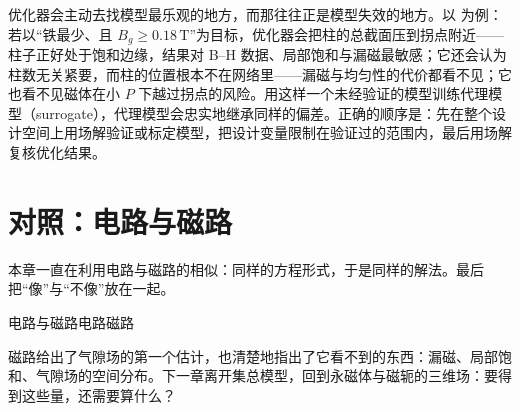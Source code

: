 \begin{pitfall}
优化器会主动去找模型最乐观的地方，而那往往正是模型失效的地方。以 为例：若以“铁最少、且 $B_g\ge0.18\,\mathrm T$”为目标，优化器会把柱的总截面压到拐点附近——柱子正好处于饱和边缘，结果对 B--H 数据、局部饱和与漏磁最敏感；它还会认为柱数无关紧要，而柱的位置根本不在网络里——漏磁与均匀性的代价都看不见；它也看不见磁体在小 $P$ 下越过拐点的风险。用这样一个未经验证的模型训练代理模型（surrogate），代理模型会忠实地继承同样的偏差。正确的顺序是：先在整个设计空间上用场解验证或标定模型，把设计变量限制在验证过的范围内，最后用场解复核优化结果。
\end{pitfall}

\section{对照：电路与磁路}\label{sec:lumped-compare}

本章一直在利用电路与磁路的相似：同样的方程形式，于是同样的解法。最后把“像”与“不像”放在一起。

\begin{compare}{电路与磁路}{电路}{磁路}
\end{compare}

磁路给出了气隙场的第一个估计，也清楚地指出了它看不到的东西：漏磁、局部饱和、气隙场的空间分布。下一章离开集总模型，回到永磁体与磁轭的三维场：要得到这些量，还需要算什么？

